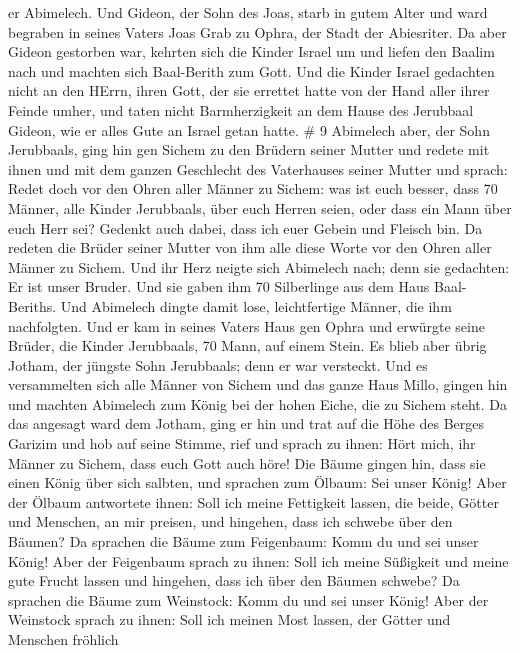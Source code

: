 er Abimelech.  Und Gideon, der Sohn des Joas, starb in
gutem Alter und ward begraben in seines Vaters Joas Grab zu Ophra, der
Stadt der Abiesriter.  Da aber Gideon gestorben war,
kehrten sich die Kinder Israel um und liefen den Baalim nach und machten
sich Baal-Berith zum Gott.  Und die Kinder Israel gedachten
nicht an den HErrn, ihren Gott, der sie errettet hatte von der Hand
aller ihrer Feinde umher,  und taten nicht Barmherzigkeit
an dem Hause des Jerubbaal Gideon, wie er alles Gute an Israel getan
hatte. \# 9  Abimelech aber, der Sohn Jerubbaals, ging hin
gen Sichem zu den Brüdern seiner Mutter und redete mit ihnen und mit dem
ganzen Geschlecht des Vaterhauses seiner Mutter und sprach: 
Redet doch vor den Ohren aller Männer zu Sichem: was ist euch besser,
dass 70 Männer, alle Kinder Jerubbaals, über euch Herren seien, oder
dass ein Mann über euch Herr sei? Gedenkt auch dabei, dass ich euer
Gebein und Fleisch bin.  Da redeten die Brüder seiner Mutter
von ihm alle diese Worte vor den Ohren aller Männer zu Sichem. Und ihr
Herz neigte sich Abimelech nach; denn sie gedachten: Er ist unser
Bruder.  Und sie gaben ihm 70 Silberlinge aus dem Haus
Baal-Beriths. Und Abimelech dingte damit lose, leichtfertige Männer, die
ihm nachfolgten.  Und er kam in seines Vaters Haus gen Ophra
und erwürgte seine Brüder, die Kinder Jerubbaals, 70 Mann, auf einem
Stein. Es blieb aber übrig Jotham, der jüngste Sohn Jerubbaals; denn er
war versteckt.  Und es versammelten sich alle Männer von
Sichem und das ganze Haus Millo, gingen hin und machten Abimelech zum
König bei der hohen Eiche, die zu Sichem steht.  Da das
angesagt ward dem Jotham, ging er hin und trat auf die Höhe des Berges
Garizim und hob auf seine Stimme, rief und sprach zu ihnen: Hört mich,
ihr Männer zu Sichem, dass euch Gott auch höre!  Die Bäume
gingen hin, dass sie einen König über sich salbten, und sprachen zum
Ölbaum: Sei unser König!  Aber der Ölbaum antwortete ihnen:
Soll ich meine Fettigkeit lassen, die beide, Götter und Menschen, an mir
preisen, und hingehen, dass ich schwebe über den Bäumen? 
Da sprachen die Bäume zum Feigenbaum: Komm du und sei unser König!
 Aber der Feigenbaum sprach zu ihnen: Soll ich meine
Süßigkeit und meine gute Frucht lassen und hingehen, dass ich über den
Bäumen schwebe?  Da sprachen die Bäume zum Weinstock: Komm
du und sei unser König!  Aber der Weinstock sprach zu
ihnen: Soll ich meinen Most lassen, der Götter und Menschen fröhlich
